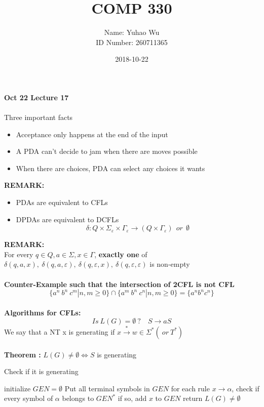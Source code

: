 \documentclass[11pt]{article}
\begin{document}
\title{COMP 330}
\date{2018-10-22}
\author{Name: Yuhao Wu\\
ID Number: 260711365
}
\maketitle

	
\textbf{Oct 22 \quad Lecture 17}\\\\
Three important facts
\begin{itemize}
	\item Acceptance only happens at the end of the input
	\item A PDA can't decide to jam when there are moves possible
	\item When there are choices, PDA can select any choices it wants
\end{itemize}

\textbf{REMARK:}
\begin{itemize}
	\item PDAs are equivalent to CFLs
	\item DPDAs are equivalent to DCFLs
	$$ \delta: Q \times \Sigma_{\varepsilon} \times \Gamma_{\varepsilon} \to (Q \times \Gamma_{\varepsilon})\ \ or \ \ \emptyset $$
\end{itemize}

\textbf{REMARK:}\\
For every $q \in Q, a \in \Sigma,  x\in \Gamma$, \textbf{exactly one } of $\delta(q, a, x),\ \delta(q, a, \varepsilon ),\ \delta( q, \varepsilon, x ),\  \delta (q, \varepsilon, \varepsilon ) $ is non-empty\\
\\
\textbf{Counter-Example such that the intersection of 2CFL is not CFL}
$$\{ a^n\ b^n\ c^m | n, m \geq 0  \} \cap \{ a^m\ b^n\ c^n | n, m \geq 0  \} = 
\{ a^n b^n c^n \} $$
\\
\textbf{Algorithms for CFLs:}
$$Is\ L(G) = \emptyset\ ? \quad S \to aS$$
We say that a NT x is generating if $x \xrightarrow{*} w \in \Sigma^* (\ or\ T^*)$\\
\\
\textbf{Theorem : } $L(G) \neq \emptyset \iff S$ is generating\\

\newpage
\begin{algorithm}
\caption{Check if it is generating}
\begin{algorithmic}[1]
\State initialize $GEN = \emptyset$
\State Put all terminal symbols in $GEN$
\State for each rule $x \to \alpha$, check if every symbol of $\alpha$ belongs to $GEN^*$
\State if so, add $x$ to $GEN$
\EndWhile\label{euclidendwhile}
	\State return $L(G) \neq \emptyset$ 
\EndIf
\EndProcedure
\end{algorithmic}
\end{algorithm}
\end{document}
